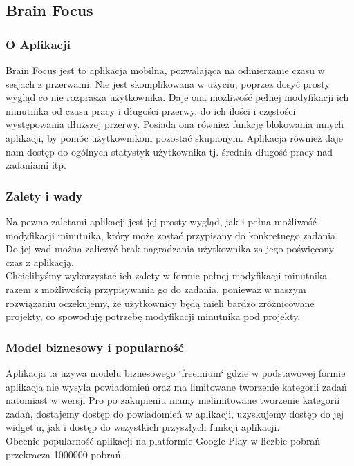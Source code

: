 \documentclass[a4paper,11pt]{report}
\begin{document}
\subsection{Brain Focus}
\subsubsection{O Aplikacji}
Brain Focus jest to aplikacja mobilna, pozwalająca na odmierzanie czasu w sesjach z przerwami.
 Nie jest skomplikowana w użyciu, poprzez dosyć prosty wygląd co nie rozprasza użytkownika.
 Daje ona możliwość pełnej modyfikacji ich minutnika od czasu pracy i długości przerwy, do ich ilości i częstości występowania dłuższej przerwy.
 Posiada ona również funkcję blokowania innych aplikacji, by pomóc użytkownikom pozostać skupionym.
 Aplikacja również daje nam dostęp do ogólnych statystyk użytkownika tj. średnia długość pracy nad zadaniami itp.
\subsubsection{Zalety i wady}
Na pewno zaletami aplikacji jest jej prosty wygląd,
 jak i pełna możliwość modyfikacji minutnika,
 który może zostać przypisany do konkretnego zadania.
\vspace{0,5cm}
 \\Do jej wad można zaliczyć brak nagradzania użytkownika za jego poświęcony czas z aplikacją.
\vspace{0,5cm}
\\Chcielibyśmy wykorzystać ich zalety w formie pełnej modyfikacji minutnika razem z możliwością przypisywania go do zadania,
 ponieważ w naszym rozwiązaniu oczekujemy,
 że użytkownicy będą mieli bardzo zróżnicowane projekty, co spowoduję potrzebę modyfikacji minutnika pod projekty.
\subsubsection{Model biznesowy i popularność}
Aplikacja ta używa modelu biznesowego `freemium` gdzie w podstawowej formie aplikacja nie wysyła powiadomień
 oraz ma limitowane tworzenie kategorii zadań natomiast w wersji Pro
 po zakupieniu mamy nielimitowane tworzenie kategorii zadań,
 dostajemy dostęp do powiadomień w aplikacji,
 uzyskujemy dostęp do jej widget'u,
 jak i dostęp do wszystkich przyszłych funkcji aplikacji.
\vspace{0,5cm}\\Obecnie popularność aplikacji na platformie Google Play w liczbie pobrań przekracza 1000000 pobrań.
\end{document}
